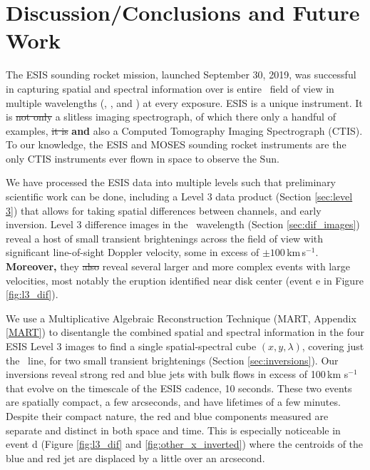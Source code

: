     	
\section{Discussion/Conclusions and Future Work}
	The ESIS sounding rocket mission, launched September 30, 2019, was successful in capturing spatial and spectral information over is entire \esisfov \ field of view in multiple wavelengths (\hei, \mgxbright, and \ov) at every exposure.
	ESIS is a unique instrument.  
	It is \sout{not only} a slitless imaging spectrograph, of which there only a handful of examples, \sout{it is} \textbf{and} also a Computed Tomography Imaging Spectrograph (CTIS).  
	To our knowledge, the ESIS and MOSES sounding rocket instruments are the only CTIS instruments ever flown in space to observe the Sun. 
	
	We have processed the  ESIS data into multiple levels such that preliminary scientific work can be done, including a Level 3 data product (Section \ref{sec:level 3}) that allows for taking spatial differences between channels, and early inversion.
	Level 3 difference images in the \ov \ wavelength (Section \ref{sec:dif_images}) reveal a host of small transient brightenings across the field of view with significant line-of-sight Doppler velocity, some in excess of $\pm 100\,$km\,s$^{-1}$.
	\textbf{Moreover,} they \sout{also} reveal several larger and more complex events with large velocities, most notably the eruption identified near disk center (event e in Figure \ref{fig:l3_dif}).
	
	We use a Multiplicative Algebraic Reconstruction Technique (MART, Appendix \ref{MART}) to disentangle the combined spatial and spectral information in the four ESIS Level 3 images to find a single spatial-spectral cube $(x,y,\lambda)$, covering just the \ov\ line, for two small transient brightenings (Section \ref{sec:inversions}).
	Our inversions reveal strong red and blue jets with bulk flows in excess of 100\,km s$^{-1}$ that evolve on the timescale of the ESIS cadence, 10 seconds.
	These two events are spatially compact, a few arcseconds, and have lifetimes of a few minutes.
	Despite their compact nature, the red and blue components measured are separate and distinct in both space and time. 
	This is especially noticeable in event d (Figure \ref{fig:l3_dif} and \ref{fig:other_x_inverted}) where the centroids of the blue and red jet are displaced by a little over an arcsecond. 
	

